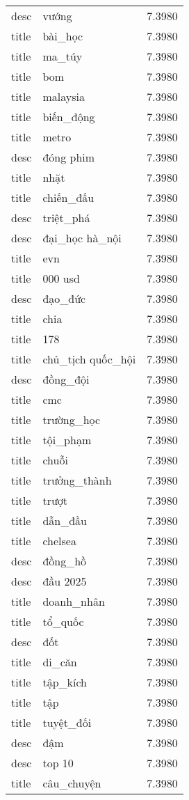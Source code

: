 \documentclass{article}
\begin{document}
\begin{tabular}{lll}
desc & vướng & 7.3980\\
title & bài\_học & 7.3980\\
title & ma\_túy & 7.3980\\
title & bom & 7.3980\\
title & malaysia & 7.3980\\
title & biến\_động & 7.3980\\
title & metro & 7.3980\\
desc & đóng phim & 7.3980\\
title & nhặt & 7.3980\\
title & chiến\_đấu & 7.3980\\
desc & triệt\_phá & 7.3980\\
desc & đại\_học hà\_nội & 7.3980\\
title & evn & 7.3980\\
title & 000 usd & 7.3980\\
desc & đạo\_đức & 7.3980\\
title & chia & 7.3980\\
title & 178 & 7.3980\\
title & chủ\_tịch quốc\_hội & 7.3980\\
desc & đồng\_đội & 7.3980\\
title & cmc & 7.3980\\
title & trường\_học & 7.3980\\
title & tội\_phạm & 7.3980\\
title & chuỗi & 7.3980\\
title & trưởng\_thành & 7.3980\\
title & trượt & 7.3980\\
title & dẫn\_đầu & 7.3980\\
title & chelsea & 7.3980\\
desc & đồng\_hồ & 7.3980\\
desc & đầu 2025 & 7.3980\\
title & doanh\_nhân & 7.3980\\
title & tổ\_quốc & 7.3980\\
desc & đốt & 7.3980\\
title & di\_căn & 7.3980\\
title & tập\_kích & 7.3980\\
title & tập & 7.3980\\
title & tuyệt\_đối & 7.3980\\
desc & đậm & 7.3980\\
desc & top 10 & 7.3980\\
title & câu\_chuyện & 7.3980\\

\end{tabular}
\end{document}
